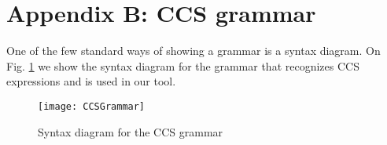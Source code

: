 \section*{Appendix B: CCS grammar}

One of the few standard ways of showing a grammar is a syntax diagram. On Fig. \ref{fig:CCSGrammar} we show the syntax diagram
for the grammar that recognizes CCS expressions and is used in our tool.

\begin{figure}
\centering
\texttt{[image: CCSGrammar]}
\caption{Syntax diagram for the CCS grammar}
\label{fig:CCSGrammar}
\end{figure}